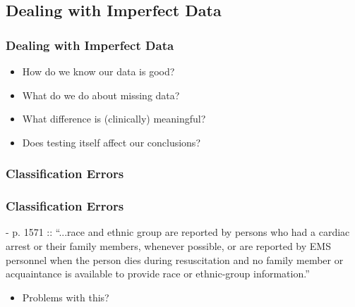 \documentclass{beamer}
\begin{document}
	\subsection{Dealing with Imperfect Data}
		\begin{frame}
			\frametitle{Dealing with Imperfect Data}
				\begin{itemize}
					\item How do we know our data is good?
					\item What do we do about missing data?
					\item What difference is (clinically) meaningful?
					\item Does testing itself affect our conclusions?
				\end{itemize}
		\end{frame}
		\subsubsection*{Classification Errors}
			\begin{frame}
				\frametitle{Classification Errors}
				- p. 1571 :: ``...race and ethnic group are reported by persons who had a cardiac arrest or their family members, whenever possible, or are reported by EMS personnel when the person dies during resuscitation and no family member or acquaintance is available to provide race or ethnic-group information.''
				\begin{itemize}
					\item Problems with this?
				\end{itemize}
			\end{frame}
\end{document}

